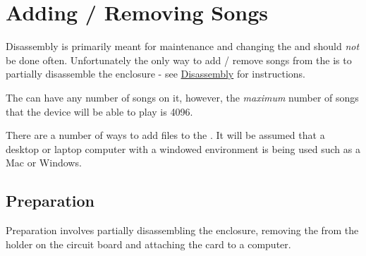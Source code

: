 \section{Adding / Removing Songs} \label{Add Songs}

Disassembly is primarily meant for maintenance and changing the 
and should \textit{not} be done often.  Unfortunately the only way to
add / remove songs from the  is to partially disassemble the enclosure
- see \hyperref[Disassembly]{Disassembly} for instructions.

\par\medskip

The  can have any number of songs on it, however, the \textit{maximum}
number of songs that the device will be able to play is \num{4096}.

\par\medskip

There are a number of ways to add files to the .  It will be assumed
that a desktop or laptop computer with a windowed environment is being used
such as a Mac or Windows.

\subsection{Preparation}

Preparation involves partially disassembling the enclosure, removing the
 from the holder on the circuit board and attaching the card to a
computer.


